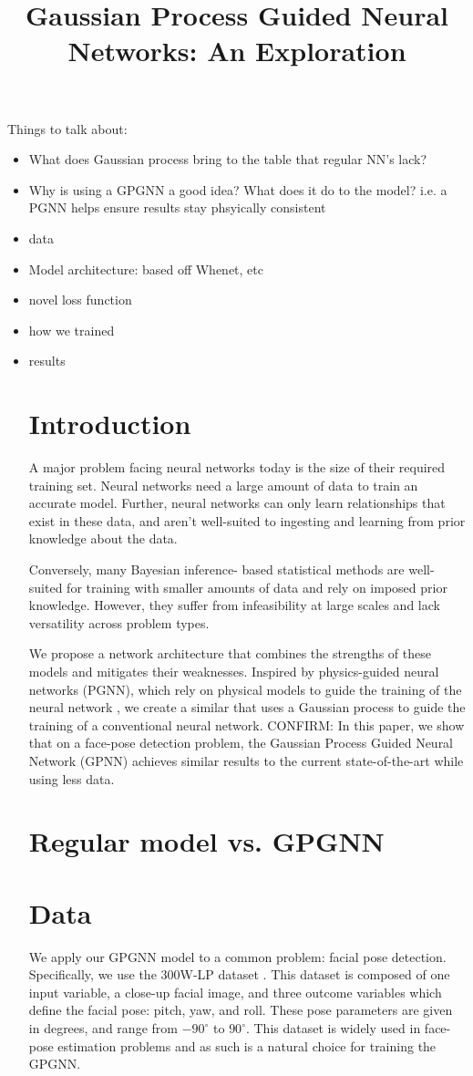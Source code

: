 \documentclass[11pt,letterpaper]{article}
\title{Gaussian Process Guided Neural Networks: An Exploration}
\author{\name}
\begin{document}
\maketitle
Things to talk about:
\begin{itemize}
  \item What does Gaussian process bring to the table that regular NN's lack?
  \item Why is using a GPGNN a good idea? What does it do to the model? i.e. a PGNN helps ensure results stay phsyically consistent
  \item data
  \item Model architecture: based off Whenet, etc
  \item novel loss function
  \item how we trained
  \item results
\section{Introduction}
  A major problem facing neural networks today is the size of their required training set. Neural networks need a large amount of data to train an accurate model. Further, neural networks can only learn relationships that exist in these data, and aren't well-suited to ingesting and learning from prior knowledge about the data.

  Conversely, many Bayesian inference- based statistical methods are well-suited for training with smaller amounts of data and rely on imposed prior knowledge. However, they suffer from infeasibility at large scales and lack versatility across problem types.

  We propose a network architecture that combines the strengths of these models and mitigates their weaknesses.
  Inspired by physics-guided neural networks (PGNN), which rely on physical models to guide the training of the neural network \cite{PGNN}, we create a similar that uses a Gaussian process to guide the training of a conventional neural network. {\color{red} CONFIRM: In this paper, we show that on a face-pose detection problem, the Gaussian Process Guided Neural Network (GPNN) achieves similar results to the current  state-of-the-art \cite{whenet} while using less data.}

\section{Regular model vs. GPGNN}

\section{Data}
  We apply our GPGNN model to a common problem: facial pose detection. Specifically, we use the 300W-LP dataset \cite{300wlp}. This dataset is composed of one input variable, a close-up facial image, and three outcome variables which define the facial pose: pitch, yaw, and roll. These pose parameters are given in degrees, and range from $-90^{\circ}$ to $90^{\circ}$. This dataset is widely used in face-pose estimation problems and as such is a natural choice for training the GPGNN.


\end{itemize}
\end{document}
